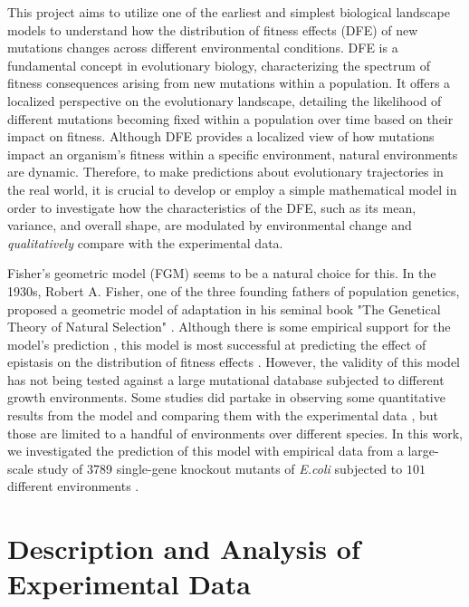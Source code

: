 \documentclass[11pt]{article}
\begin{document}
This project aims to utilize one of the earliest and simplest biological landscape models to understand how the distribution of fitness effects (DFE) of new mutations changes across different environmental conditions. DFE is a fundamental concept in evolutionary biology, characterizing the spectrum of fitness consequences arising from new mutations within a population. It offers a localized perspective on the evolutionary landscape, detailing the likelihood of different mutations becoming fixed within a population over time based on their impact on fitness. Although DFE provides a localized view of how mutations impact an organism's fitness within a specific environment, natural environments are dynamic. Therefore, to make predictions about evolutionary trajectories in the real world, it is crucial to develop or employ a simple mathematical model in order to investigate how the characteristics of the DFE, such as its mean, variance, and overall shape, are modulated by environmental change and \textit{qualitatively} compare with the experimental data.

Fisher's geometric model (FGM) seems to be a natural choice for this. In the 1930s, Robert A. Fisher, one of the three founding fathers of population genetics, proposed a geometric model of adaptation in his seminal book  "The Genetical Theory of Natural Selection" \cite{fisher1930genetical}. Although there is some empirical support for the model's prediction \cite{maclean2010diminishing, sousa2012cost}, this model is most successful at predicting the effect of epistasis on the distribution of fitness effects \cite{martin2007distributions, weinreich2013fisher}. However, the validity of this model has not being tested against a large mutational database subjected to different growth environments. Some studies did partake in observing some quantitative results from the model and comparing them with the experimental data \cite{martin2006fitness, martin2015fitness}, but those are limited to a handful of environments over different species. In this work, we investigated the prediction of this model with empirical data from a large-scale study of 3789 single-gene knockout mutants of \textit{E.coli} subjected to $101$ different environments \cite{price2018mutant}. 





\section{Description and Analysis of Experimental Data}
\end{document}
